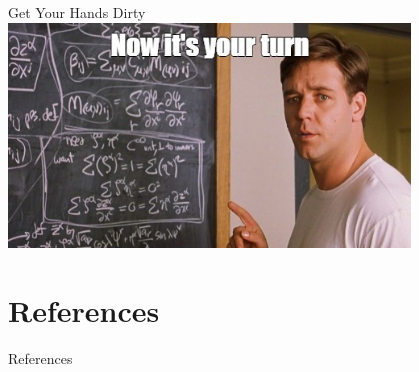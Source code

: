 		\begin{frame}{Get Your Hands Dirty}
		    \vspace{5mm}
		    \centering
            \includegraphics[width=0.8\textwidth]{images/your_turn.jpg}

		\end{frame}

	\section{References}
		\begin{frame}{References}
			
			
		\end{frame}
